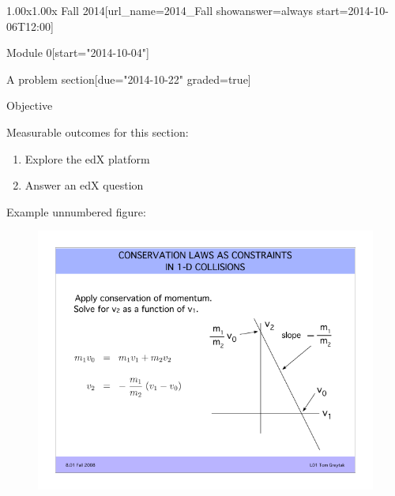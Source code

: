 \documentclass[12pt]{article}
\begin{document}
\begin{edXcourse}{1.00x}{1.00x Fall 2014}[url_name=2014_Fall showanswer=always start=2014-10-06T12:00]

\begin{edXchapter*}{Module 0}[start="2014-10-04"]

\begin{edXsequential}{A problem section}[due="2014-10-22" graded=true]

\begin{edXtext}{Objective}

Measurable outcomes for this section:
\begin{enumerate}
  \item {} Explore the edX platform
  \item {} Answer an edX question
\end{enumerate}

Example unnumbered figure:
\begin{figure}
  \begin{center}
    \includegraphics{example-image}
  \end{center}
\end{figure}


\end{edXtext}
\end{edXsequential}
\end{edXchapter*}
\end{edXcourse}
\end{document}
